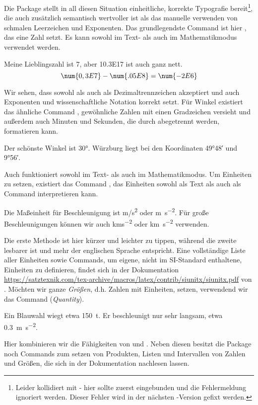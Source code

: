 Die Package  stellt in all diesen Situation einheitliche, korrekte Typografie bereit\footnote{Leider kollidiert  mit  - hier sollte  zuerst eingebunden und die Fehlermeldung ignoriert werden. Dieser Fehler wird in der nächsten -Version gefixt werden.}, die auch zusätzlich semantisch wertvoller ist als das manuelle verwenden von schmalen Leerzeichen und Exponenten.
Das grundlegendste Command ist hier , das eine Zahl setzt.
Es kann sowohl im Text- als auch im Mathematikmodus verwendet werden.
\begin{latexlisting}
	Meine Lieblingszahl ist \num{7}, aber \num{10.3E17} ist auch ganz nett.
	\begin{equation*}
		\num{0,3E7} - \num{.05E8} = \num{-2E6}
	\end{equation*}
\end{latexlisting}
Wir sehen, dass  sowohl  als auch \key{,} als Dezimaltrennzeichen akzeptiert und auch Exponenten und wissenschaftliche Notation korrekt setzt.
Für Winkel existiert das ähnliche Command , gewöhnliche Zahlen mit einen Gradzeichen versieht und außerdem auch Minuten und Sekunden, die durch \key{;} abegetrennt werden, formatieren kann. 
\begin{latexlisting}
	Der schönste Winkel ist \ang{30}.
	Würzburg liegt bei den Koordinaten \ang{49;48} und \ang{9;56}.
\end{latexlisting}
Auch  funktioniert sowohl im Text- als auch im Mathematikmodus.
Um Einheiten zu setzen, existiert das Command , das Einheiten sowohl als Text als auch als Command interpretieren kann.
\begin{latexlisting}
	Die Maßeinheit für Beschleunigung ist \unit{m/s^2} oder \unit{\meter\per\square\second}.
	Für große Beschleunigungen können wir auch \unit{kms^{-2}} oder \unit{\kilo\meter\per\square\second} verwenden.
\end{latexlisting}
Die erste Methode ist hier kürzer und leichter zu tippen, während die zweite lesbarer ist und mehr der englischen Sprache entspricht.
Eine vollständige Liste aller Einheiten sowie Commands, um eigene, nicht im SI-Standard enthaltene, Einheiten zu definieren, findet sich in der Dokumentation \url{https://satztexnik.com/tex-archive/macros/latex/contrib/siunitx/siunitx.pdf} von .
Möchten wir ganze \emph{Größen}, d.h. Zahlen mit Einheiten, setzen, verwendend wir das Command  (\emph{Quantity}).
\begin{latexlisting}
	Ein Blauwahl wiegt etwa \qty{150}{t}.
	Er beschleunigt nur sehr langsam, etwa \qty{.3}{\meter\per\square\second}.
\end{latexlisting}
Hier kombinieren wir die Fähigkeiten von  und .
Neben diesen besitzt die Package noch Commands zum setzen von Produkten, Listen und Intervallen von Zahlen und Größen, die sich in der Dokumentation nachlesen lassen.

